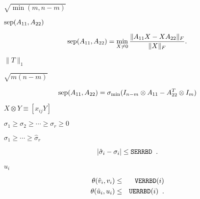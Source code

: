 {\newpage\clearpage
{}%
$\sqrt { \min ( m,n-m ) }$%
\lthtmlinlinemathZ
\lthtmlcheckvsize\clearpage}

{\newpage\clearpage
{}%
${\rm sep}(A_{11},A_{22})$%
\lthtmlinlinemathZ
\lthtmlcheckvsize\clearpage}

{\newpage\clearpage
{}%
\begin{displaymath}
{\rm sep}(A_{11},A_{22}) = \min_{X \neq 0} \frac{\|A_{11}X - XA_{22}\|_F}
{\| X \|_F}.
\end{displaymath}%
\lthtmldisplayZ
\lthtmlcheckvsize\clearpage}

{\newpage\clearpage
{}%
$\| T \|_1$%
\lthtmlinlinemathZ
\lthtmlcheckvsize\clearpage}

{\newpage\clearpage
{}%
$\sqrt{m(n-m)}$%
\lthtmlinlinemathZ
\lthtmlcheckvsize\clearpage}

{\newpage\clearpage
{}%
\begin{displaymath}
{\rm sep}(A_{11},A_{22}) = \sigma_{\min} ( I_{n-m} \otimes A_{11} -
A_{22}^T \otimes I_m )
\end{displaymath}%
\lthtmldisplayZ
\lthtmlcheckvsize\clearpage}

{\newpage\clearpage
{}%
$X \otimes Y \equiv [ x_{ij} Y]$%
\lthtmlinlinemathZ
\lthtmlcheckvsize\clearpage}

{\newpage\clearpage
{}%
$\sigma_1 \geq \sigma_2 \geq \cdots \geq \sigma_{r} \geq 0$%
\lthtmlinlinemathZ
\lthtmlcheckvsize\clearpage}

{\newpage\clearpage
{}%
$\hat{\sigma}_1 \geq \cdots \geq \hat{\sigma}_{r}$%
\lthtmlinlinemathZ
\lthtmlcheckvsize\clearpage}

{\newpage\clearpage
{}%
\begin{displaymath}
| \hat{\sigma}_i - \sigma_i | \leq {\tt SERRBD} \; \; .
\end{displaymath}%
\lthtmldisplayZ
\lthtmlcheckvsize\clearpage}

{\newpage\clearpage
{}%
$\hat{u}_i$%
\lthtmlinlinemathZ
\lthtmlcheckvsize\clearpage}

{\newpage\clearpage
{}%
\begin{eqnarray*}
\theta ( \hat{v}_i , v_i ) & \leq & {\tt VERRBD}(i) \\
\theta ( \hat{u}_i , u_i ) & \leq & {\tt UERRBD}(i) \; \; .
\end{eqnarray*}%
\lthtmldisplayZ
\lthtmlcheckvsize\clearpage}

